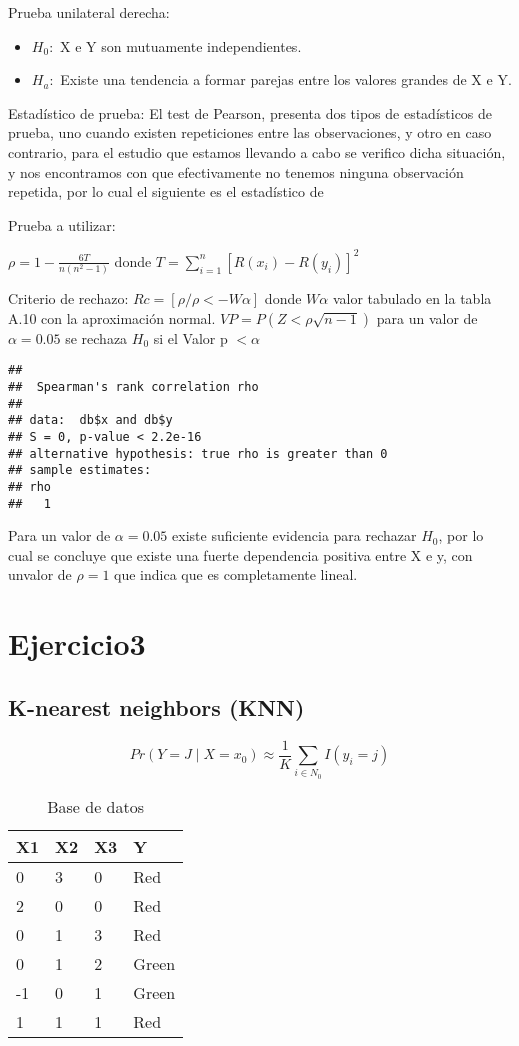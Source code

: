 \documentclass[
  12pt,
  letterpaper,
]{article}
\providecommand{\tightlist}{%
  \setlength{\itemsep}{0pt}\setlength{\parskip}{0pt}}
\begin{document}
Prueba unilateral derecha:

\begin{itemize}
\tightlist
\item
  \(H_0:\) X e Y son mutuamente independientes.
\item
  \(H_a:\) Existe una tendencia a formar parejas entre los valores
  grandes de X e Y.
\end{itemize}

Estadístico de prueba: El test de Pearson, presenta dos tipos de
estadísticos de prueba, uno cuando existen repeticiones entre las
observaciones, y otro en caso contrario, para el estudio que estamos
llevando a cabo se verifico dicha situación, y nos encontramos con que
efectivamente no tenemos ninguna observación repetida, por lo cual el
siguiente es el estadístico de

Prueba a utilizar:

\(\rho = 1 - \frac{6T}{n(n^2-1)}\) donde
\(T = \sum_{i=1}^{n} [R(x_i)-R(y_i)]^2\)

Criterio de rechazo: \(Rc=[\rho/\rho <- W\alpha]\) donde \(W\alpha\)
valor tabulado en la tabla A.10 con la aproximación normal.
\(VP = P(Z < \rho\sqrt{n-1})\) para un valor de \(\alpha = 0.05\) se
rechaza \(H_0\) si el Valor p \(< \alpha\)

\begin{verbatim}
## 
##  Spearman's rank correlation rho
## 
## data:  db$x and db$y
## S = 0, p-value < 2.2e-16
## alternative hypothesis: true rho is greater than 0
## sample estimates:
## rho 
##   1
\end{verbatim}

Para un valor de \(\alpha = 0.05\) existe suficiente evidencia para
rechazar \(H_0\), por lo cual se concluye que existe una fuerte
dependencia positiva entre X e y, con unvalor de \(\rho = 1\) que indica
que es completamente lineal.

\section{Ejercicio3}
\subsection{K-nearest neighbors (KNN)}

\[Pr(Y = J \mid X = x_0) \approx \frac{1}{K} \sum_{i \in N_0}I(y_i=j)\]

\begin{table}[H]

\caption{\label{tab:unnamed-chunk-9}Base de datos}
\centering
\begin{tabular}[t]{l|l|l|l}
\hline
X1 & X2 & X3 & Y\\
\hline
0 & 3 & 0 & Red\\
\hline
2 & 0 & 0 & Red\\
\hline
0 & 1 & 3 & Red\\
\hline
0 & 1 & 2 & Green\\
\hline
-1 & 0 & 1 & Green\\
\hline
1 & 1 & 1 & Red\\
\hline
\end{tabular}
\end{table}
\end{document}
